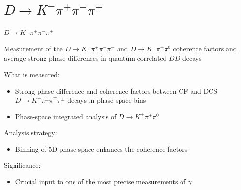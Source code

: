 \documentclass{beamer}
\begin{document}
\section{\texorpdfstring{$D\to K^-\pi^+\pi^-\pi^+$}{D2Kpipipi}}
\begin{frame}{$D\to K^-\pi^+\pi^-\pi^+$}
\begin{tcolorbox}[enhanced,frame style image=blueshade_cropped.png,
  opacityback=0.75,opacitybacktitle=0.25,
  colback=blue!5!white,colframe=blue!75!black,
  title=\color{white}{\href{https://link.springer.com/article/10.1007/JHEP05(2021)164}{\color{white}{JHEP \textbf{5} (2021) 164}}}]
  {\Large Measurement of the $D\to K^-\pi^+\pi^-\pi^-$ and $D\to K^-\pi^+\pi^0$ coherence factors and average strong-phase differences in quantum-correlated $D\bar{D}$ decays}
\end{tcolorbox}
  What is measured:
  \begin{itemize}
    \item{Strong-phase difference and coherence factors between CF and DCS $D\to K^\mp\pi^\pm\pi^\mp\pi^\pm$ decays in phase space bins}
    \item{Phase-space integrated analysis of $D\to K^\mp\pi^\pm\pi^0$}
  \end{itemize}
  Analysis strategy:
  \begin{itemize}
    \item{Binning of 5D phase space enhances the coherence factors}
  \end{itemize}
  Significance:
  \begin{itemize}
    \item{Crucial input to one of the most precise measurements of $\gamma$}
  \end{itemize}
\end{frame}
\end{document}
